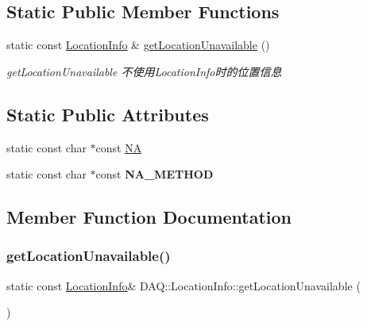 \subsection*{Static Public Member Functions}
\begin{DoxyCompactItemize}
\item 
static const \hyperlink{classDAQ_1_1LocationInfo}{Location\+Info} \& \hyperlink{classDAQ_1_1LocationInfo_a53eefcbf6b4c11a6d002732f5f358673}{get\+Location\+Unavailable} ()
\begin{DoxyCompactList}\small\item\em get\+Location\+Unavailable 不使用\+Location\+Info时的位置信息 \end{DoxyCompactList}\end{DoxyCompactItemize}
\subsection*{Static Public Attributes}
\begin{DoxyCompactItemize}
\item 
static const char $\ast$const \hyperlink{classDAQ_1_1LocationInfo_a323fbfcb7157adbe65bfa32c5c6c578a}{NA}
\item 
\mbox{\label{classDAQ_1_1LocationInfo_a15cf20b804a081425c32b0a06e43e3bb}} 
static const char $\ast$const {\bfseries N\+A\+\_\+\+M\+E\+T\+H\+OD}
\end{DoxyCompactItemize}


\subsection{Member Function Documentation}
\mbox{\label{classDAQ_1_1LocationInfo_a53eefcbf6b4c11a6d002732f5f358673}} 
\subsubsection{\texorpdfstring{get\+Location\+Unavailable()}{getLocationUnavailable()}}
{\footnotesize\ttfamily static const \hyperlink{classDAQ_1_1LocationInfo}{Location\+Info}\& D\+A\+Q\+::\+Location\+Info\+::get\+Location\+Unavailable (\begin{DoxyParamCaption}{ }\end{DoxyParamCaption})\hspace{0.3cm}{\ttfamily [static]}}



